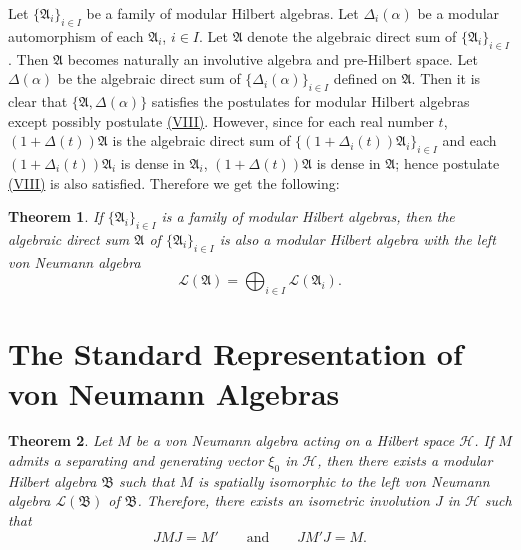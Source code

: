 \documentclass[12pt,b5paper,twoside]{article}
\theoremstyle{takesaki}
\newtheorem{theorem}{Theorem}[section]
\numberwithin{equation}{section}
\newcommand{\modcondref}[1]{\hyperref[cond:2.1:#1]{(#1)}}
\begin{document}
Let $\{\mathfrak A_i\}_{i\in I}$ be a family of modular Hilbert
algebras.  Let $\Delta_i(\alpha)$ be a modular automorphism of each
$\mathfrak A_i$, $i\in I$.  Let $\mathfrak A$ denote the algebraic
direct sum of $\{\mathfrak A_i\}_{i\in I}$.  Then $\mathfrak A$
becomes naturally an involutive algebra and pre-Hilbert space.  Let
$\Delta(\alpha)$ be the algebraic direct sum of
$\{\Delta_i(\alpha)\}_{i\in I}$ defined on $\mathfrak A$.  Then it is
clear that $\{\mathfrak A,\Delta(\alpha)\}$ satisfies the postulates
for modular Hilbert algebras except possibly postulate
  \modcondref{VIII}.  However, since for each real number $t$,
$(1+\Delta(t))\mathfrak A$ is the algebraic direct sum of
$\{(1+\Delta_i(t))\mathfrak A_i\}_{i\in I}$ and each
$(1+\Delta_i(t))\mathfrak A_i$ is dense in $\mathfrak A_i$,
$(1+\Delta(t))\mathfrak A$ is dense in $\mathfrak A$; hence
  postulate \modcondref{VIII} is also satisfied.  Therefore we get the following:

\begin{theorem}\label{thm:11.2}
If $\{\mathfrak A_i\}_{i\in I}$ is a family of modular Hilbert
algebras, then the algebraic direct sum $\mathfrak A$ of
$\{\mathfrak A_i\}_{i\in I}$ is also a modular Hilbert algebra with
the left von Neumann algebra
\[
  \mathcal L(\mathfrak A)=\bigoplus_{i\in I}\mathcal L(\mathfrak A_i).
\]
\end{theorem}

\section{The Standard Representation of von Neumann Algebras}
\label{sec:12}

\begin{theorem}\label{thm:12.1}
Let $M$ be a von Neumann algebra acting on a Hilbert space
$\mathcal H$.  If $M$ admits a separating and generating vector
$\xi_0$ in $\mathcal H$, then there exists a modular Hilbert algebra
$\mathfrak B$ such that $M$ is spatially isomorphic to the left von
Neumann algebra $\mathcal L(\mathfrak B)$ of $\mathfrak B$.
Therefore, there exists an isometric involution $J$ in $\mathcal H$
such that
\[
  JMJ=M'
  \qquad\text{and}\qquad
  JM'J=M.
\]
\end{theorem}
\end{document}
